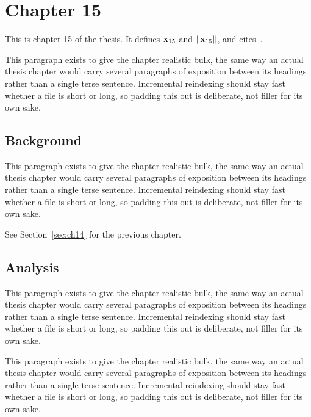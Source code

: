 \section{Chapter 15}
\label{sec:ch15}

This is chapter 15 of the thesis. It defines $\mathbf{x}_{15}$ and $\lVert \mathbf{x}_{15} \rVert$, and cites~\cite{ref1}.

This paragraph exists to give the chapter realistic bulk, the same way an actual thesis chapter would carry several paragraphs of exposition between its headings rather than a single terse sentence. Incremental reindexing should stay fast whether a file is short or long, so padding this out is deliberate, not filler for its own sake.

\subsection{Background}
\label{sec:ch15:background}

This paragraph exists to give the chapter realistic bulk, the same way an actual thesis chapter would carry several paragraphs of exposition between its headings rather than a single terse sentence. Incremental reindexing should stay fast whether a file is short or long, so padding this out is deliberate, not filler for its own sake.

See Section~\ref{sec:ch14} for the previous chapter.

\subsection{Analysis}
\label{sec:ch15:analysis}

This paragraph exists to give the chapter realistic bulk, the same way an actual thesis chapter would carry several paragraphs of exposition between its headings rather than a single terse sentence. Incremental reindexing should stay fast whether a file is short or long, so padding this out is deliberate, not filler for its own sake.

This paragraph exists to give the chapter realistic bulk, the same way an actual thesis chapter would carry several paragraphs of exposition between its headings rather than a single terse sentence. Incremental reindexing should stay fast whether a file is short or long, so padding this out is deliberate, not filler for its own sake.
